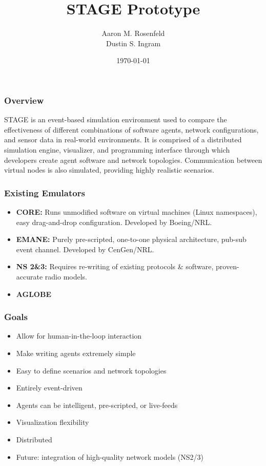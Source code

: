 \documentclass[mathserif]{beamer}
\author{Aaron M. Rosenfeld \\ Dustin S. Ingram}
\title{STAGE Prototype}
\date{\today}
\begin{document}
\frame{\titlepage}

\frame
{
    \frametitle{Overview}
    STAGE is an event-based simulation environment used to compare the
    effectiveness of different combinations of software agents, network
    configurations, and sensor data in real-world environments.  It is comprised of
    a distributed simulation engine, visualizer, and programming interface through
    which developers create agent software and network topologies.  Communication
    between virtual nodes is also simulated, providing highly realistic scenarios.
}

\frame
{
    \frametitle{Existing Emulators}

    \begin{itemize}
        \item \textbf{CORE:} Runs unmodified software on virtual machines (Linux namespaces), easy drag-and-drop configuration.  Developed by Boeing/NRL.
        \item \textbf{EMANE:} Purely pre-scripted, one-to-one physical architecture, pub-sub event channel.  Developed by CenGen/NRL.
        \item \textbf{NS 2\&3:} Requires re-writing of existing protocols \& software, proven-accurate radio models.
        \item \textbf{AGLOBE} 
    \end{itemize}
}

\frame
{
    \frametitle{Goals}
    \begin{itemize}
        \item Allow for human-in-the-loop interaction
        \item Make writing agents extremely simple
        \item Easy to define scenarios and network topologies
        \item Entirely event-driven
        \item Agents can be intelligent, pre-scripted, or live-feeds
        \item Visualization flexibility
        \item Distributed
        \item Future: integration of high-quality network models (NS2/3)
    \end{itemize}
}
\end{document}
